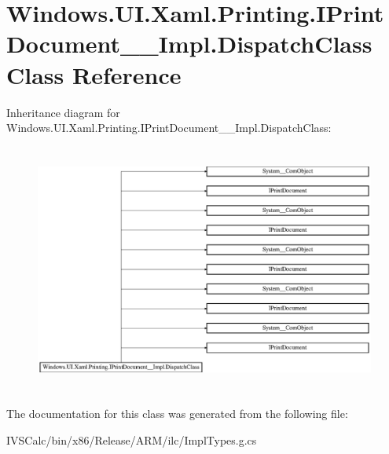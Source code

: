 \hypertarget{class_windows_1_1_u_i_1_1_xaml_1_1_printing_1_1_i_print_document_____impl_1_1_dispatch_class}{}\section{Windows.\+U\+I.\+Xaml.\+Printing.\+I\+Print\+Document\+\_\+\+\_\+\+Impl.\+Dispatch\+Class Class Reference}
\label{class_windows_1_1_u_i_1_1_xaml_1_1_printing_1_1_i_print_document_____impl_1_1_dispatch_class}
Inheritance diagram for Windows.\+U\+I.\+Xaml.\+Printing.\+I\+Print\+Document\+\_\+\+\_\+\+Impl.\+Dispatch\+Class\+:\begin{figure}[H]
\begin{center}
\leavevmode
\includegraphics[height=8.257373cm]{class_windows_1_1_u_i_1_1_xaml_1_1_printing_1_1_i_print_document_____impl_1_1_dispatch_class}
\end{center}
\end{figure}


The documentation for this class was generated from the following file\+:\begin{DoxyCompactItemize}
\item 
I\+V\+S\+Calc/bin/x86/\+Release/\+A\+R\+M/ilc/Impl\+Types.\+g.\+cs\end{DoxyCompactItemize}
